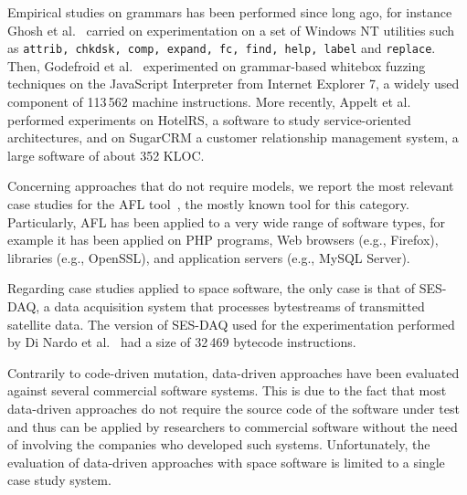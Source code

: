 
Empirical studies on grammars has been performed since long ago, for instance Ghosh et al.~\cite{ghosh1998testing} carried on experimentation on a set of Windows NT utilities such as \texttt{attrib, chkdsk, comp, expand, fc, find, help, label} and \texttt{replace}.
Then, Godefroid et al.~\cite{Godefroid:GrammarBasedFuzzying:2008} experimented on grammar-based whitebox fuzzing techniques on the JavaScript Interpreter from Internet Explorer 7, a widely used component of 113\,562 machine instructions.
More recently, Appelt et al.~\cite{Appelt:SQLI:ISSTA:2014} performed experiments on HotelRS, a software to study service-oriented architectures, and on SugarCRM a customer relationship management system, a large software of about 352 KLOC.

Concerning approaches that do not require models, we report the most relevant case studies for the AFL tool~\cite{AFL:industrialcases}, the mostly known tool for this category. Particularly, AFL has been applied to a very wide range of software types, for example it has been applied on PHP programs, Web browsers (e.g., Firefox), libraries (e.g., OpenSSL), and application servers (e.g., MySQL Server). 

Regarding case studies applied to space software, the only case is that of SES-DAQ, a data acquisition system that processes bytestreams of transmitted satellite data. The version of SES-DAQ used for the experimentation performed by Di Nardo et al.~\cite{di2017augmenting,di2015evolutionary,di2015generating} had a size of 32\,469 bytecode instructions.

Contrarily to code-driven mutation, data-driven approaches have been evaluated against several commercial software systems. This is due to the fact that most data-driven approaches do not require the source code of the software under test and thus can be applied by researchers to commercial software without the need of involving the companies who developed such systems. Unfortunately, the evaluation of  data-driven approaches with space software is limited to a single case study system.




\clearpage




